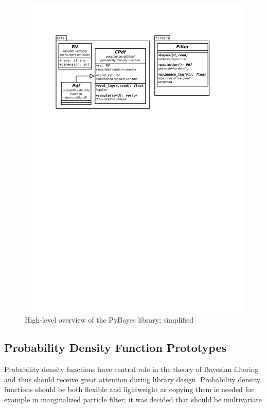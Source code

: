 \begin{figure}[h]
	\centering
	\includegraphics[width=\textwidth,keepaspectratio=true,clip=true,trim=3cm 196mm 3cm 3cm]{./diagrams/PyBayes.pdf}
	\vspace{-8mm}
	\caption{High-level overview of the PyBayes library; simplified}
	\label{fig:DiaPyBayes}
\end{figure}

\subsection{Probability Density Function Prototypes}

Probability density functions have central role in the theory of Bayesian filtering and thus should
receive great attention during library design. Probability density functions should be both flexible
and lightweight as copying them is needed for example in marginalized particle filter; it was
decided that {\pdfs} should be multivariate 

